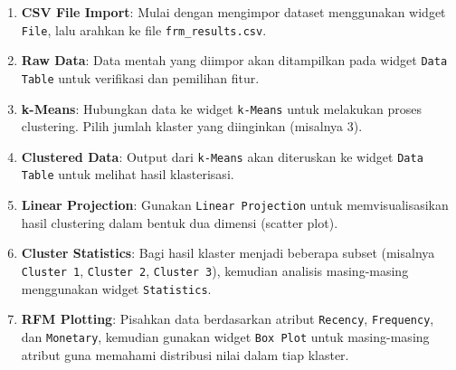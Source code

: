 \begin{enumerate}
	\item \textbf{CSV File Import}: Mulai dengan mengimpor dataset menggunakan widget \texttt{File}, lalu arahkan ke file \texttt{frm\_results.csv}.
	\item \textbf{Raw Data}: Data mentah yang diimpor akan ditampilkan pada widget \texttt{Data Table} untuk verifikasi dan pemilihan fitur.
	\item \textbf{k-Means}: Hubungkan data ke widget \texttt{k-Means} untuk melakukan proses clustering. Pilih jumlah klaster yang diinginkan (misalnya 3).
	\item \textbf{Clustered Data}: Output dari \texttt{k-Means} akan diteruskan ke widget \texttt{Data Table} untuk melihat hasil klasterisasi.
	\item \textbf{Linear Projection}: Gunakan \texttt{Linear Projection} untuk memvisualisasikan hasil clustering dalam bentuk dua dimensi (scatter plot).
	\item \textbf{Cluster Statistics}: Bagi hasil klaster menjadi beberapa subset (misalnya \texttt{Cluster 1}, \texttt{Cluster 2}, \texttt{Cluster 3}), kemudian analisis masing-masing menggunakan widget \texttt{Statistics}.
	\item \textbf{RFM Plotting}: Pisahkan data berdasarkan atribut \texttt{Recency}, \texttt{Frequency}, dan \texttt{Monetary}, kemudian gunakan widget \texttt{Box Plot} untuk masing-masing atribut guna memahami distribusi nilai dalam tiap klaster.
\end{enumerate}

